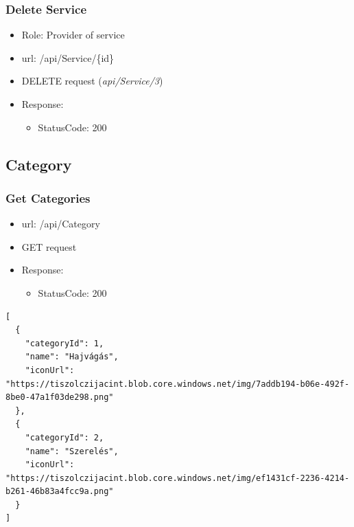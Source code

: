 \documentclass[11pt]{article}
\begin{document}
\subsubsection{Delete Service}
\label{sec:org05c8718}
\begin{itemize}
\item Role: Provider of service
\item url: /api/Service/\{id\}
\item DELETE request (\emph{api/Service/3})
\item Response:
\begin{itemize}
\item StatusCode: 200
\end{itemize}
\end{itemize}
\subsection{Category}
\label{sec:orga6975f3}
\subsubsection{Get Categories}
\label{sec:orgcd33aa4}
\begin{itemize}
\item url: /api/Category
\item GET request
\item Response:
\begin{itemize}
\item StatusCode: 200
\end{itemize}
\end{itemize}
\begin{verbatim}
[
  {
    "categoryId": 1,
    "name": "Hajvágás",
    "iconUrl": "https://tiszolczijacint.blob.core.windows.net/img/7addb194-b06e-492f-8be0-47a1f03de298.png"
  },
  {
    "categoryId": 2,
    "name": "Szerelés",
    "iconUrl": "https://tiszolczijacint.blob.core.windows.net/img/ef1431cf-2236-4214-b261-46b83a4fcc9a.png"
  }
]
\end{verbatim}
\end{document}

